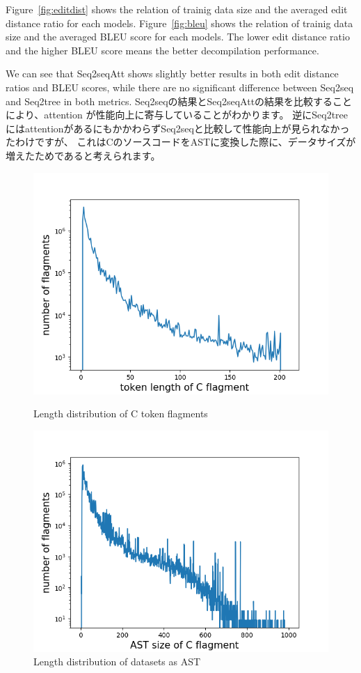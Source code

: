 \documentclass[senior,final,11pt]{iscs-thesis}
\begin{document}
Figure~\ref{fig:editdist} shows the relation of trainig data size and the averaged edit distance ratio for each models.
Figure~\ref{fig:bleu} shows the relation of trainig data size and the averaged BLEU score for each models.
The lower edit distance ratio and the higher BLEU score means the better decompilation performance.

We can see that Seq2seqAtt shows slightly better results in both edit distance ratios and BLEU scores, 
while there are no significant difference between Seq2seq and Seq2tree in both metrics.
Seq2seqの結果とSeq2seqAttの結果を比較することにより、attention が性能向上に寄与していることがわかります。
逆にSeq2treeにはattentionがあるにもかかわらずSeq2seqと比較して性能向上が見られなかったわけですが、
これはCのソースコードをASTに変換した際に、データサイズが増えたためであると考えられます。

\begin{figure}[]
	\includegraphics[width=12cm]{c_lens.png}
	\caption{Length distribution of C token flagments}
	\label{fig:csizes}
	\includegraphics[width=12cm]{ast_lens.png}
	\caption{Length distribution of datasets as AST}
	\label{fig:astsizes}
\end{figure}
\end{document}
